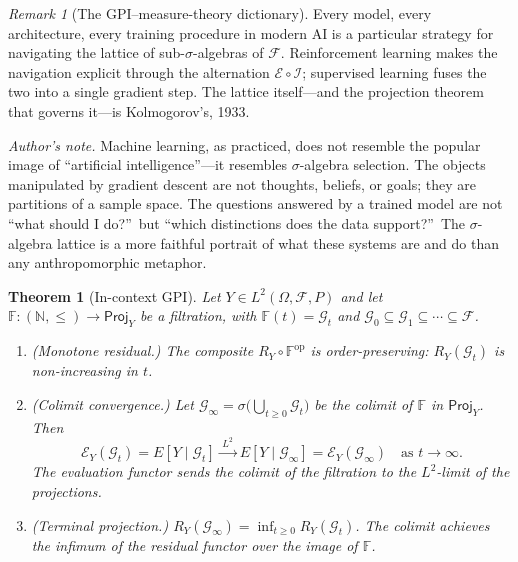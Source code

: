 \documentclass[12pt]{amsart}
\newtheorem{theorem}{Theorem}[section]
\theoremstyle{definition}
\theoremstyle{remark}
\newtheorem*{remark}{Remark}
\newcommand{\cF}{\mathcal{F}}
\newcommand{\Proj}{\mathsf{Proj}}
\begin{document}
\begin{remark}[The GPI--measure-theory dictionary]
\noindent Every model, every architecture, every training procedure in modern AI is a particular strategy for navigating the lattice of sub-$\sigma$-algebras of $\cF$. Reinforcement learning makes the navigation explicit through the alternation $\mathcal{E} \circ \mathcal{I}$; supervised learning fuses the two into a single gradient step. The lattice itself---and the projection theorem that governs it---is Kolmogorov's, 1933.

\smallskip
\noindent\textit{Author's note.} Machine learning, as practiced, does not resemble the popular image of ``artificial intelligence''---it resembles $\sigma$-algebra selection. The objects manipulated by gradient descent are not thoughts, beliefs, or goals; they are partitions of a sample space. The questions answered by a trained model are not ``what should I do?''\ but ``which distinctions does the data support?''\ The $\sigma$-algebra lattice is a more faithful portrait of what these systems are and do than any anthropomorphic metaphor.
\end{remark}

\begin{theorem}[In-context GPI]\label{thm:in-context-gpi}
Let $Y \in L^2(\Omega, \cF, P)$ and let
$\mathbb{F} : (\mathbb{N}, \leq) \to \Proj_Y$ be a filtration, with
$\mathbb{F}(t) = \mathcal{G}_t$ and
$\mathcal{G}_0 \subseteq \mathcal{G}_1 \subseteq \cdots \subseteq \cF$.
\begin{enumerate}[label=(\roman*)]
\item \emph{(Monotone residual.)} The composite
$R_Y \circ \mathbb{F}^{\mathrm{op}}$ is order-preserving:
$R_Y(\mathcal{G}_t)$ is non-increasing in $t$.

\item \emph{(Colimit convergence.)} Let
$\mathcal{G}_\infty = \sigma\!\bigl(\bigcup_{t \geq 0} \mathcal{G}_t\bigr)$
be the colimit of $\mathbb{F}$ in $\Proj_Y$. Then
\[
\mathcal{E}_Y(\mathcal{G}_t) = E[Y \mid \mathcal{G}_t]
\xrightarrow{\;L^2\;} E[Y \mid \mathcal{G}_\infty]
= \mathcal{E}_Y(\mathcal{G}_\infty)
\quad \text{as } t \to \infty.
\]
The evaluation functor sends the colimit of the filtration to the
$L^2$-limit of the projections.

\item \emph{(Terminal projection.)}
$R_Y(\mathcal{G}_\infty) = \inf_{t \geq 0} R_Y(\mathcal{G}_t)$.
The colimit achieves the infimum of the residual functor over the image
of $\mathbb{F}$.
\end{enumerate}
\end{theorem}
\end{document}
